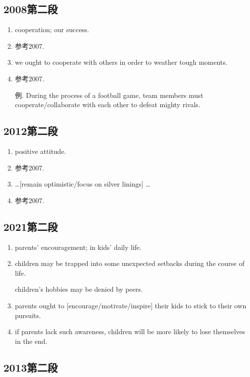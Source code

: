\subsection{2008第二段}

\begin{enumerate}
    \item cooperation; our success.
    \item 参考2007.
    \item we ought to cooperate with others in order to weather tough moments.
    \item 参考2007.
    \item[例.] During the process of a football game, team members must cooperate/collaborate with 
    each other to defeat mighty rivals.
\end{enumerate}

\subsection{2012第二段}

\begin{enumerate}
    \item positive attitude.
    \item 参考2007.
    \item \dots [remain optimistic/focus on silver linings] \dots
    \item 参考2007.
\end{enumerate}

\subsection{2021第二段}

\begin{enumerate}
    \item parents' encouragement; in kids' daily life.
    \item children may be trapped into some unexpected setbacks
    during the course of life.

    children's hobbies may be denied by peers.
    \item parents ought to [encourage/motivate/inspire] their kids to stick to 
    their own pursuits.
    \item if parents lack such awareness, children will be more 
    likely to lose themselves in the end.
\end{enumerate}

\subsection{2013第二段}

